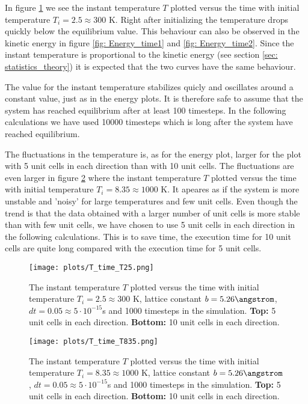 \documentclass[11pt,a4wide]{article}
\begin{document}
In figure \ref{fig: T_time1} we see the instant temperature $T$ plotted versus the time with initial temperature $T_i = 2.5 \approx 300$ K. Right after initializing the temperature drops quickly below the equilibrium value. This behaviour can also be observed in the kinetic energy in figure \ref{fig: Energy_time1} and \ref{fig: Energy_time2}. Since the instant temperature is proportional to the kinetic energy (see section \ref{sec: statistics_theory}) it is expected that the two curves have the same behaviour.

The value for the instant temperature stabilizes quicly and oscillates around a constant value, just as in the energy plots. It is therefore safe to assume that the system has reached equilibrium after at least 100 timesteps. In the following calculations we have used 10000 timesteps which is long after the system have reached equilibrium. 

The fluctuations in the temperature is, as for the energy plot, larger for the plot with 5 unit cells in each direction than with 10 unit cells. The fluctuations are even larger in figure \ref{fig: T_time2} where the instant temperature $T$ plotted versus the time with initial temperature $T_i = 8.35 \approx 1000$ K. It apeares as if the system is more unstable and 'noisy' for large temperatures and few unit cells. Even though the trend is that the data obtained with a larger number of unit cells is more stable than with few unit cells, we have chosen to use 5 unit cells in each direction in the following calculations. This is to save time, the execution time for 10 unit cells are quite long compared with the execution time for 5 unit cells. 

\begin{figure}[htp]
\centering
\texttt{[image: plots/T\_time\_T25.png]}
\caption{The instant temperature $T$ plotted versus the time with initial temperature $T_i = 2.5 \approx 300$ K, lattice constant $b=5.26 \angstrom$, $dt=0.05\approx  5\cdot 10^{-15}$s and 1000 timesteps in the simulation. \textbf{Top:} 5 unit cells in each direction. \textbf{Bottom:} 10 unit cells in each direction.}
\label{fig: T_time1}
\end{figure}

\begin{figure}[htp]
\centering
\texttt{[image: plots/T\_time\_T835.png]}
\caption{The instant temperature $T$ plotted versus the time with initial temperature $T_i = 8.35 \approx 1000$ K, lattice constant $b=5.26 \angstrom$, $dt=0.05\approx  5\cdot 10^{-15}$s and 1000 timesteps in the simulation. \textbf{Top:} 5 unit cells in each direction. \textbf{Bottom:} 10 unit cells in each direction.}
\label{fig: T_time2}
\end{figure}
\end{document}
